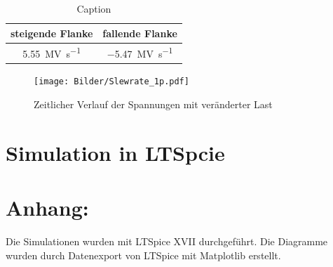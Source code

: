 \begin{table}[H]
    \centering
    \begin{tabular}{|c|c|}
    \hline
         steigende Flanke & fallende Flanke  \\ \hline
         \SI{5.55}{\mega \volt \per \second} & \SI{-5.47}{\mega \volt \per \second} \\ \hline
    \end{tabular}
    \caption{Caption}
    \label{tab:my_label}
\end{table}

\begin{figure}[H]
    \centering
    \texttt{[image: Bilder/Slewrate\_1p.pdf]}
    \caption{Zeitlicher Verlauf der Spannungen mit veränderter Last}
\end{figure}

\section{Simulation in LTSpcie}

\section{Anhang:}

Die Simulationen wurden mit LTSpice XVII durchgeführt. Die Diagramme wurden durch Datenexport von LTSpice mit Matplotlib erstellt.
